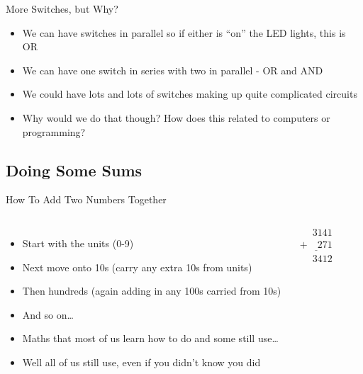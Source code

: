 \documentclass{beamer}
\begin{document}
\begin{frame}{More Switches, but Why?}
  \begin{itemize}
  \item
    We can have switches in parallel so if either is ``on'' the LED lights, this is OR
  \item
    We can have one switch in series with two in parallel - OR and AND
  \item
    We could have lots and lots of switches making up quite complicated circuits
  \item
    Why would we do that though?  How does this related to computers or programming?
  \end{itemize}
\end{frame}


\subsection[Maths]{Doing Some Sums}

\begin{frame}{How To Add Two Numbers Together}
  \begin{columns}
    \begin{itemize}
    \item
      Start with the units (0-9) 
    \item
      Next move onto 10s (carry any extra 10s from units)
    \item
      Then hundreds (again adding in any 100s carried from 10s)
    \item
      And so on\dots
    \item
      Maths that most of us learn how to do and some still use\dots
    \item
      Well all of us still use, even if you didn't know you did
    \end{itemize}

    \begin{equation*}
      \begin{array}{c}
        \phantom{+9}3141\\
        \underline{+\phantom{99}271}\\
        \phantom{+9}3412\\
      \end{array}
    \end{equation*}
  \end{columns}
  
\end{frame}
\end{document}
